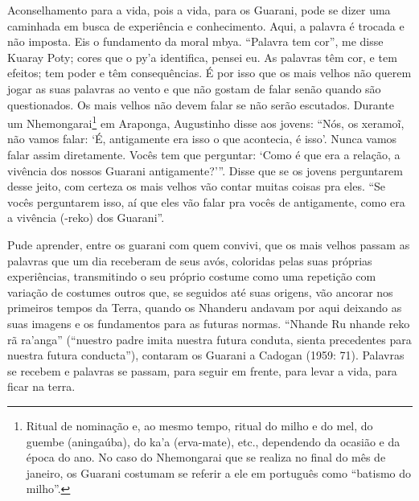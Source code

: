 \documentclass{article}
\begin{document}
Aconselhamento para a vida, pois a vida, para os Guarani, pode se dizer
uma caminhada em busca de experi\^encia e conhecimento. Aqui, a palavra
\'e trocada e n\~ao imposta. Eis o fundamento da moral mbya.
{\textquotedblleft}Palavra tem cor{\textquotedblright}, me disse Kuaray
Poty; cores que o py{\textquoteright}a identifica, pensei eu. As
palavras t\^em cor, e tem efeitos; tem poder e t\^em consequ\^encias.
\'E por isso que os mais velhos n\~ao querem jogar as suas palavras ao
vento e que n\~ao gostam de falar sen\~ao quando s\~ao questionados. Os
mais velhos n\~ao devem falar se n\~ao ser\~ao escutados. Durante um
Nhemongarai\footnote{ Ritual de nomina\c{c}\~ao e, ao mesmo tempo,
ritual do milho e do mel, do guembe (aninga\'uba), do
ka{\textquoteright}a (erva-mate), etc., dependendo da ocasi\~ao e da
\'epoca do ano. No caso do Nhemongarai que se realiza no final do m\^es
de janeiro, os Guarani costumam se referir a ele em portugu\^es como
{\textquotedblleft}batismo do milho{\textquotedblright}.} em Araponga,
Augustinho disse aos jovens: {\textquotedblleft}N\'os, os xeramo\~{i},
n\~ao vamos falar: {\textquoteleft}\'E, antigamente era isso o que
acontecia, \'e isso{\textquoteright}. Nunca vamos falar assim
diretamente. Voc\^es tem que perguntar: {\textquoteleft}Como \'e que
era a rela\c{c}\~ao, a viv\^encia dos nossos Guarani
antigamente?{\textquoteright}{\textquotedblright}. Disse que se os
jovens perguntarem desse jeito, com certeza os mais velhos v\~ao contar
muitas coisas pra eles. {\textquotedblleft}Se voc\^es perguntarem isso,
a\'i que eles v\~ao falar pra voc\^es de antigamente, como era a
viv\^encia (-reko) dos Guarani{\textquotedblright}. 

Pude aprender, entre os guarani com quem convivi, que os mais velhos
passam as palavras que um dia receberam de seus av\'os, coloridas pelas
suas pr\'oprias experi\^encias, transmitindo o seu pr\'oprio costume
como uma repeti\c{c}\~ao com varia\c{c}\~ao de costumes outros que, se
seguidos at\'e suas origens, v\~ao ancorar nos primeiros tempos da
Terra, quando os Nhanderu andavam por aqui deixando as suas imagens e
os fundamentos para as futuras normas. {\textquotedblleft}Nhande Ru
nhande reko r\~a ra{\textquoteright}anga{\textquotedblright}
({\textquotedblleft}nuestro padre imita nuestra futura conduta, sienta
precedentes para nuestra futura conducta{\textquotedblright}), contaram
os Guarani a Cadogan (1959: 71). Palavras se recebem e palavras se
passam, para seguir em frente, para levar a vida, para ficar na terra.
\end{document}
